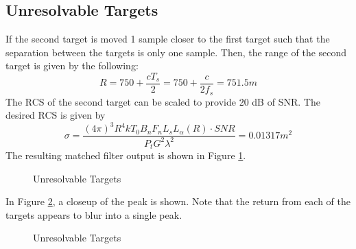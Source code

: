 \documentclass[12pt,letterpaper]{article}
\begin{document}
\subsection{Unresolvable Targets}
If the second target is moved 1 sample closer to the first target such that the separation between the targets is only one sample. Then, the range of the second target is given by the following:
\begin{equation}
R = 750 + \frac{cT_s}{2} = 750 + \frac{c}{2f_s} = 751.5 m
\end{equation}
The RCS of the second target can be scaled to provide 20 dB of SNR. The desired RCS is given by
\begin{equation}
\sigma = \frac{(4\pi)^3 R^4 k T_0 B_n F_n L_s L_\alpha(R)\cdot SNR}{P_t G^2 \lambda^2} = 0.01317  m^2
\end{equation}
The resulting matched filter output is shown in Figure \ref{Unresolvable Full}.
\begin{figure}[H]
\caption{Unresolvable Targets}
\label{Unresolvable Full}
\end{figure}
\noindent
In Figure \ref{Unresolvable Peak}, a closeup of the peak is shown. Note that the return from each of the targets appears to blur into a single peak.
\begin{figure}[H]
\caption{Unresolvable Targets}
\label{Unresolvable Peak}
\end{figure}
\end{document}

